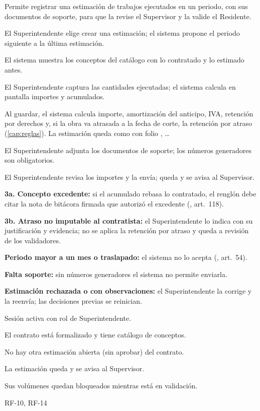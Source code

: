 {Permite registrar una estimación de trabajos ejecutados en un periodo, con sus documentos de soporte, para que la revise el Supervisor y la valide el Residente.}
{\item El Superintendente elige crear una estimación; el sistema propone el periodo siguiente a la última estimación.
 \item El sistema muestra los conceptos del catálogo con lo contratado y lo estimado antes.
 \item El Superintendente captura las cantidades ejecutadas; el sistema calcula en pantalla importes y acumulados.
 \item Al guardar, el sistema calcula importe, amortización del anticipo, IVA, retención por derechos y, si la obra va atrasada a la fecha de corte, la retención por atraso (\cref{cap:reglas}). La estimación queda como  con folio , \ldots
 \item El Superintendente adjunta los documentos de soporte; los números generadores son obligatorios.
 \item El Superintendente revisa los importes y la envía; queda  y se avisa al Supervisor.}
{\item \textbf{3a. Concepto excedente:} si el acumulado rebasa lo contratado, el renglón debe citar la nota de bitácora firmada que autorizó el excedente (\reg, art.~118).
 \item \textbf{3b. Atraso no imputable al contratista:} el Superintendente lo indica con su justificación y evidencia; no se aplica la retención por atraso y queda a revisión de los validadores.
 \item \textbf{Periodo mayor a un mes o traslapado:} el sistema no lo acepta (\ley, art.~54).
 \item \textbf{Falta soporte:} sin números generadores el sistema no permite enviarla.
 \item \textbf{Estimación rechazada o con observaciones:} el Superintendente la corrige y la reenvía; las decisiones previas se reinician.}
{\item Sesión activa con rol de Superintendente.
 \item El contrato está formalizado y tiene catálogo de conceptos.
 \item No hay otra estimación abierta (sin aprobar) del contrato.}
{\item La estimación queda  y se avisa al Supervisor.
 \item Sus volúmenes quedan bloqueados mientras está en validación.}
{RF-10, RF-14}

